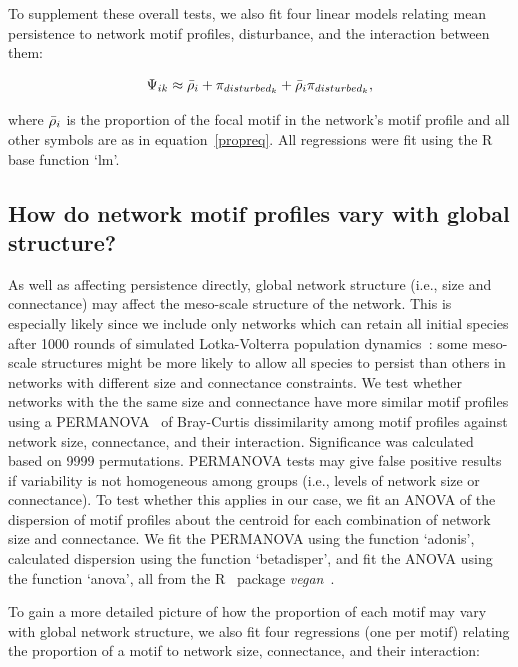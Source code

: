 \documentclass[12pt]{article}
\begin{document}
\begin{spacing}{2.0}
        
        To supplement these overall tests, we also fit four linear models relating mean persistence to network motif profiles, disturbance, and the interaction between them:

            \begin{equation}
                \Psi_{ik} \approx \Bar{\rho}_{i} + \pi_{disturbed_k} + \Bar{\rho}_{i}\pi_{disturbed_k} ,
                \label{netpropeq}
            \end{equation}
        
        where $\Bar{\rho}_{i}$ is the proportion of the focal motif in the network's motif profile and all other symbols are as in equation~\ref{propreq}. 
        All regressions were fit using the R~\citep{R} base function `lm'.
    

    \subsection{How do network motif profiles vary with global structure?}
    
        As well as affecting persistence directly, global network structure (i.e., size and connectance) may affect the meso-scale structure of the network.
        This is especially likely since we include only networks which can retain all initial species after 1000 rounds of simulated Lotka-Volterra population dynamics~\citep{Cirtwill2021_inprep}:  some meso-scale structures might be more likely to allow all species to persist than others in networks with different size and connectance constraints.
        We test whether networks with the the same size and connectance have more similar motif profiles using a PERMANOVA~\citep{Anderson2001} of Bray-Curtis dissimilarity among motif profiles against network size, connectance, and their interaction.
        Significance was calculated based on 9999 permutations.
        PERMANOVA tests may give false positive results if variability is not homogeneous among groups (i.e., levels of network size or connectance).
        To test whether this applies in our case, we fit an ANOVA of the dispersion of motif profiles about the centroid for each combination of network size and connectance. 
        We fit the PERMANOVA using the function `adonis', calculated dispersion using the function `betadisper', and fit the ANOVA using the function `anova', all from the R~\citep{R} package \emph{vegan}~\citep{vegan}.


        To gain a more detailed picture of how the proportion of each motif may vary with global network structure, we also fit four regressions (one per motif) relating the proportion of a motif to network size, connectance, and their interaction:


\end{spacing}
\end{document}
